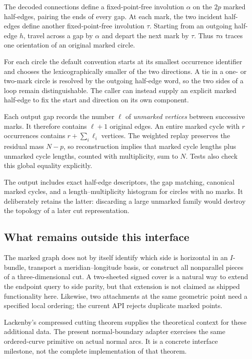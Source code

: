 \documentclass[11pt,letterpaper]{article}
\theoremstyle{definition}
\theoremstyle{remark}
\begin{document}
The decoded connections define a fixed-point-free involution $\alpha$ on
the $2p$ marked half-edges, pairing the ends of every gap. At each mark,
the two incident half-edges define another fixed-point-free involution
$\tau$. Starting from an outgoing half-edge $h$, travel across a gap by
$\alpha$ and depart the next mark by $\tau$. Thus $\tau\alpha$ traces one
orientation of an original marked circle.

For each circle the default convention starts at its smallest occurrence
identifier and chooses the lexicographically smaller of the two directions.
A tie in a one- or two-mark circle is resolved by the outgoing half-edge
word, so the two sides of a loop remain distinguishable. The caller can
instead supply an explicit marked half-edge to fix the start and direction
on its own component.

Each output gap records the number $\ell$ of \emph{unmarked vertices}
between successive marks. It therefore contains $\ell+1$ original edges.
An entire marked cycle with $r$ occurrences contains
$r+\sum_i\ell_i$ vertices. The weighted replay preserves the residual
mass $N-p$, so reconstruction implies that marked cycle lengths plus
unmarked cycle lengths, counted with multiplicity, sum to $N$. Tests
also check this global equality explicitly.

The output includes exact half-edge descriptors, the gap matching,
canonical marked cycles, and a length--multiplicity histogram for circles
with no marks. It deliberately retains the latter: discarding a large
unmarked family would destroy the topology of a later cut representation.

\subsection{What remains outside this interface}

The marked graph does not by itself identify which side is horizontal in
an $I$-bundle, transport a meridian--longitude basis, or construct all
nonparallel pieces of a three-dimensional cut. A two-sheeted signed cover
is a natural way to extend the endpoint query to side parity, but that
extension is not claimed as shipped functionality here. Likewise, two
attachments at the same geometric point need a specified local ordering;
the current API rejects duplicate marked points.

Lackenby's compressed cutting theorem supplies the theoretical context for
these additional data. The present normal-boundary adapter exercises the
same ordered-curve primitive on actual normal arcs. It is a concrete
interface milestone, not the complete implementation of that theorem.
\end{document}
